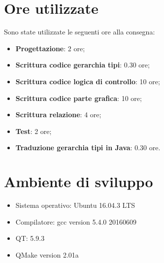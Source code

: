 \documentclass[a4paper,10pt]{article}
\begin{document}
        \section{Ore utilizzate}
        Sono state utilizzate le seguenti ore alla consegna:
        \begin{itemize}
            \item \textbf{Progettazione}: 2 ore;
            \item \textbf{Scrittura codice gerarchia tipi}: 0.30 ore;
            \item \textbf{Scrittura codice logica di controllo}: 10 ore;
            \item \textbf{Scrittura codice parte grafica}: 10 ore;
            \item \textbf{Scrittura relazione}: 4 ore;
            \item \textbf{Test}: 2 ore;
            \item \textbf{Traduzione gerarchia tipi in Java}: 0.30 ore.

        \end{itemize}
        \section{Ambiente di sviluppo}
        \begin{itemize}
            \item Sistema operativo: Ubuntu 16.04.3 LTS
            \item Compilatore: gcc version 5.4.0 20160609
            \item QT: 5.9.3
            \item QMake version 2.01a
        \end{itemize}
\end{document}
